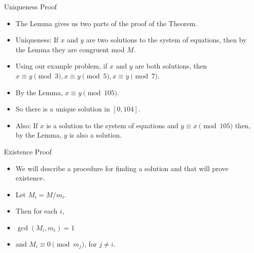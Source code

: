 \documentclass[handout]{beamer}
\begin{document}

\begin{frame}{Uniqueness Proof}

\begin{itemize}
  \item The Lemma gives us two parts of the proof of the Theorem.
  \item Uniqueness: If $x$ and $y$ are two solutions to the system of equations,
  then by the Lemma they are congruent mod $M$.
  \item Using our example problem, if $x$ and $y$ are both solutions, then
  $x\equiv y \pmod 3, x\equiv y \pmod 5, x\equiv y \pmod 7$.
  \item By the Lemma, $x\equiv y \pmod {105}$.
  \item So there is a unique solution in $[0,104]$.
  \item Also: If $x$ is a solution to the system of equations and $y\equiv x \pmod {105}$ then,
   by the Lemma, $y$ is also a solution.
\end{itemize}

\end{frame}



\begin{frame}{Existence Proof}

\begin{itemize}
  \item We will describe a procedure for finding a solution and that will prove existence.
  \item Let $M_i = M/{m_i}$.
  \item Then for each $i$,
  \item $\gcd(M_i, m_i) = 1$
  \item and $M_i \equiv 0 \pmod {m_j}$, for $j\not= i$.

\end{itemize}

\end{frame}
\end{document}
